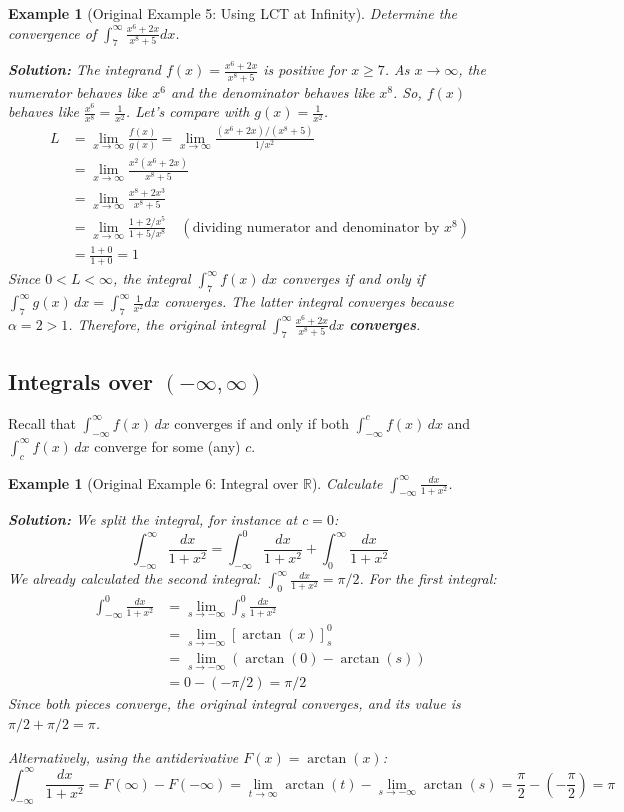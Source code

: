 \documentclass[11pt]{article}
\theoremstyle{mytheoremstyle}
\theoremstyle{mydefinitionstyle}
\newtheorem{example}[theorem]{Example}
\begin{document}
\begin{example}[Original Example 5: Using LCT at Infinity]
Determine the convergence of $\int_7^\infty \frac{x^6+2x}{x^8+5} dx$.

\textbf{Solution:}
The integrand $f(x) = \frac{x^6+2x}{x^8+5}$ is positive for $x \ge 7$.
As $x \to \infty$, the numerator behaves like $x^6$ and the denominator behaves like $x^8$. So, $f(x)$ behaves like $\frac{x^6}{x^8} = \frac{1}{x^2}$.
Let's compare with $g(x) = \frac{1}{x^2}$.
\begin{align*} L &= \lim_{x \to \infty} \frac{f(x)}{g(x)} = \lim_{x \to \infty} \frac{(x^6+2x)/(x^8+5)}{1/x^2} \\ &= \lim_{x \to \infty} \frac{x^2(x^6+2x)}{x^8+5} \\ &= \lim_{x \to \infty} \frac{x^8+2x^3}{x^8+5} \\ &= \lim_{x \to \infty} \frac{1 + 2/x^5}{1 + 5/x^8} \quad (\text{dividing numerator and denominator by } x^8) \\ &= \frac{1+0}{1+0} = 1 \end{align*}
Since $0 < L < \infty$, the integral $\int_7^\infty f(x) \, dx$ converges if and only if $\int_7^\infty g(x) \, dx = \int_7^\infty \frac{1}{x^2} dx$ converges.
The latter integral converges because $\alpha = 2 > 1$.
Therefore, the original integral $\int_7^\infty \frac{x^6+2x}{x^8+5} dx$ \textbf{converges}.
\end{example}

\subsection{Integrals over $(-\infty, \infty)$}

Recall that $\int_{-\infty}^\infty f(x) \, dx$ converges if and only if both $\int_{-\infty}^c f(x) \, dx$ and $\int_c^\infty f(x) \, dx$ converge for some (any) $c$.

\begin{example}[Original Example 6: Integral over $\mathbb{R}$]
Calculate $\int_{-\infty}^\infty \frac{dx}{1+x^2}$.

\textbf{Solution:}
We split the integral, for instance at $c=0$:
\[ \int_{-\infty}^\infty \frac{dx}{1+x^2} = \int_{-\infty}^0 \frac{dx}{1+x^2} + \int_0^\infty \frac{dx}{1+x^2} \]
We already calculated the second integral: $\int_0^\infty \frac{dx}{1+x^2} = \pi/2$.
For the first integral:
\begin{align*} \int_{-\infty}^0 \frac{dx}{1+x^2} &= \lim_{s \to -\infty} \int_s^0 \frac{dx}{1+x^2} \\ &= \lim_{s \to -\infty} [\arctan(x)]_s^0 \\ &= \lim_{s \to -\infty} (\arctan(0) - \arctan(s)) \\ &= 0 - (-\pi/2) = \pi/2 \end{align*}
Since both pieces converge, the original integral converges, and its value is $\pi/2 + \pi/2 = \pi$.

Alternatively, using the antiderivative $F(x) = \arctan(x)$:
\[ \int_{-\infty}^\infty \frac{dx}{1+x^2} = F(\infty) - F(-\infty) = \lim_{t \to \infty} \arctan(t) - \lim_{s \to -\infty} \arctan(s) = \frac{\pi}{2} - \left(-\frac{\pi}{2}\right) = \pi \]
\end{example}
\end{document}
